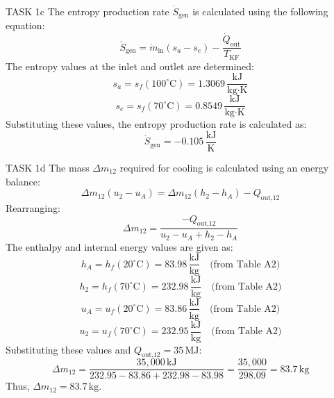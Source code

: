 TASK 1c  
The entropy production rate \( \dot{S}_{\text{gen}} \) is calculated using the following equation:  
\[
\dot{S}_{\text{gen}} = \dot{m}_{\text{in}} (s_a - s_e) - \frac{\dot{Q}_{\text{out}}}{T_{\text{KF}}}
\]  
The entropy values at the inlet and outlet are determined:  
\[
s_a = s_f(100^\circ\text{C}) = 1.3069 \, \frac{\text{kJ}}{\text{kg·K}}
\]  
\[
s_e = s_f(70^\circ\text{C}) = 0.8549 \, \frac{\text{kJ}}{\text{kg·K}}
\]  
Substituting these values, the entropy production rate is calculated as:  
\[
\dot{S}_{\text{gen}} = -0.105 \, \frac{\text{kJ}}{\text{K}}
\]  

TASK 1d  
The mass \( \Delta m_{12} \) required for cooling is calculated using an energy balance:  
\[
\Delta m_{12} (u_2 - u_A) = \Delta m_{12} (h_2 - h_A) - Q_{\text{out,12}}
\]  
Rearranging:  
\[
\Delta m_{12} = \frac{-Q_{\text{out,12}}}{u_2 - u_A + h_2 - h_A}
\]  
The enthalpy and internal energy values are given as:  
\[
h_A = h_f(20^\circ\text{C}) = 83.98 \, \frac{\text{kJ}}{\text{kg}} \quad \text{(from Table A2)}
\]  
\[
h_2 = h_f(70^\circ\text{C}) = 232.98 \, \frac{\text{kJ}}{\text{kg}} \quad \text{(from Table A2)}
\]  
\[
u_A = u_f(20^\circ\text{C}) = 83.86 \, \frac{\text{kJ}}{\text{kg}} \quad \text{(from Table A2)}
\]  
\[
u_2 = u_f(70^\circ\text{C}) = 232.95 \, \frac{\text{kJ}}{\text{kg}} \quad \text{(from Table A2)}
\]  
Substituting these values and \( Q_{\text{out,12}} = 35 \, \text{MJ} \):  
\[
\Delta m_{12} = \frac{35,000 \, \text{kJ}}{232.95 - 83.86 + 232.98 - 83.98} = \frac{35,000}{298.09} = 83.7 \, \text{kg}
\]  
Thus, \( \Delta m_{12} = 83.7 \, \text{kg} \).